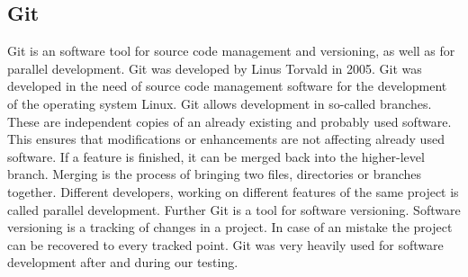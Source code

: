 \subsection{Git}
Git is an software tool for source code management and versioning, as well as for parallel development. 
Git was developed by Linus Torvald in 2005. Git was developed in the need of source code management software for the development of the operating system Linux.
Git allows development in so-called branches. These are independent copies of an already existing and probably used software. 
This ensures that modifications or enhancements are not affecting already used software. If a feature is finished, it can be merged back into the higher-level branch. 
Merging is the process of bringing two files, directories or branches together.
Different developers, working on different features of the same project is called parallel development.
Further Git is a tool for software versioning. Software versioning is a tracking of changes in a project. 
In case of an mistake the project can be recovered to every tracked point.
Git was very heavily used for software development after and during our testing. 
